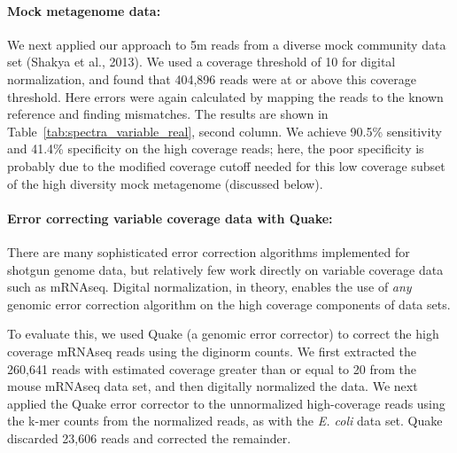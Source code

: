 \documentclass{article}
\begin{document}
\paragraph{Mock metagenome data:}


We next applied our approach to 5m reads from a diverse mock community
data set (Shakya et al., 2013). We used a coverage threshold of 10 for
digital normalization, and found that 404,896 reads were at or above
this coverage threshold.  Here errors were again calculated by mapping
the reads to the known reference and finding mismatches.  The results
are shown in Table~\ref{tab:spectra_variable_real}, second column.  We
achieve 90.5\% sensitivity and 41.4\% specificity on the high coverage
reads; here, the poor specificity is probably due to the modified coverage
cutoff needed for this low coverage subset of the high diversity
mock metagenome (discussed below).

\paragraph{Error correcting variable coverage data with Quake:}


There are many sophisticated error correction algorithms implemented
for shotgun genome data, but relatively few work directly on variable
coverage data such as mRNAseq.  Digital normalization, in theory,
enables the use of {\em any} genomic error correction algorithm on the
high coverage components of data sets.

To evaluate this, we used Quake (a genomic error corrector) to correct
the high coverage mRNAseq reads using the diginorm counts.  We first
extracted the 260,641 reads with estimated coverage greater than or
equal to 20 from the mouse mRNAseq data set, and then digitally
normalized the data.  We next applied the Quake error corrector to the
unnormalized high-coverage reads using the k-mer counts from the
normalized reads, as with the {\em E. coli} data set.  Quake discarded
23,606 reads and corrected the remainder.

\end{document}
